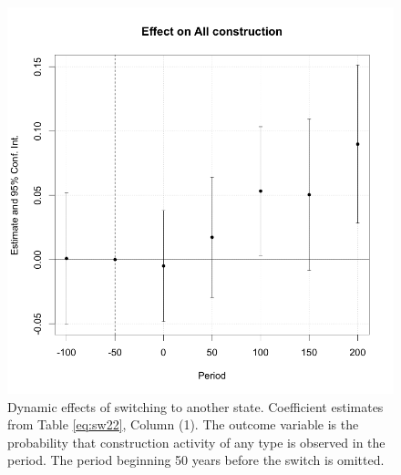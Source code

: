 \documentclass[11pt, a4paper]{article}
\begin{document}
\begin{figure}[ht]
    \centering
    \includegraphics[scale = 0.4]{paper/output/regressions/SW22_replication_50y.png}
    \caption{Dynamic effects of switching to another state. Coefficient estimates from Table \ref{eq:sw22}, Column (1). The outcome variable is the probability that construction activity of any type is observed in the period. The period beginning 50 years before the switch is omitted.}
    \label{fig:SW_replication}
\end{figure}
\end{document}
